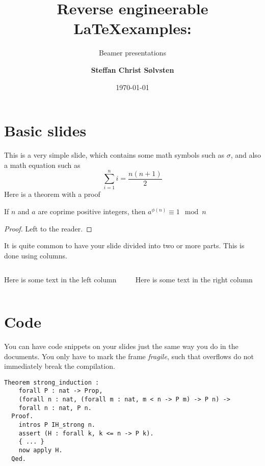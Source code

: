 \documentclass[english, aspectratio=169]{beamer}
\title{Reverse engineerable \LaTeX examples:}
\subtitle{Beamer presentations}
\author{\textbf{Steffan Christ S\o lvsten}}
\institute{Aarhus University}
\date{\today}
\begin{document}
\titleframe

\section{Basic slides}
\begin{frame}
  This is a very simple slide, which contains some math symbols such as
  $\sigma$, and also a math equation such as
  \begin{equation*}
    \sum_{i=1}^n i = \frac{n(n+1)}{2}
  \end{equation*}
  Here is a theorem with a proof

  \begin{theorem}[Euler]
    If $n$ and $a$ are coprime positive integers, then $a^{\phi(n)} \equiv 1
    \mod n$
  \end{theorem}
  \begin{proof}
    Left to the reader.
  \end{proof}
\end{frame}

\begin{frame}
  It is quite common to have your slide divided into two or more parts. This is
  done using columns.

  \begin{columns}
    \begin{column}{0.5\textwidth}
      Here is some text in the left column
    \end{column}
    \begin{column}{0.5\textwidth}
      Here is some text in the right column
    \end{column}
  \end{columns}
\end{frame}

\section{Code}
\begin{frame}[fragile]
  You can have code snippets on your slides just the same way you do in the
  documents. You only have to mark the frame \emph{fragile}, such that overflows
  do not immediately break the compilation.

  \begin{lstlisting}[language=coq, caption={Exercise on proving strong induction
      in \emph{Software Foundations - Volume 1}}]
  Theorem strong_induction :
    forall P : nat -> Prop,
    (forall n : nat, (forall m : nat, m < n -> P m) -> P n) ->
    forall n : nat, P n.
  Proof.
    intros P IH_strong n.
    assert (H : forall k, k <= n -> P k).
    { ... }
    now apply H.
  Qed.
  \end{lstlisting}
\end{frame}
\end{document}
